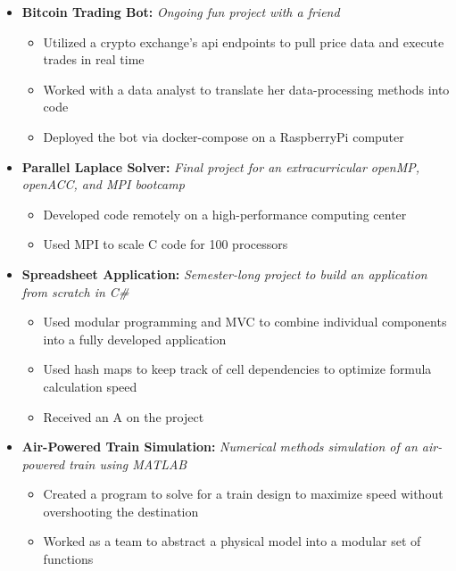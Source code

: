 \documentclass{article}
\begin{document}
\begin{itemize}
    \item \textbf{Bitcoin Trading Bot:}
        \textit{Ongoing fun project with a friend}
        \begin{itemize}
            \item Utilized a crypto exchange's api endpoints to pull price data and execute trades in real time
            \item Worked with a data analyst to translate her data-processing methods into code
            \item Deployed the bot via docker-compose on a RaspberryPi computer
        \end{itemize}
    \vspace{4mm}
    \item \textbf{Parallel Laplace Solver:} \textit{Final project for an extracurricular openMP, openACC, and MPI bootcamp}
    \begin{itemize}
        \item Developed code remotely on a high-performance computing center
        \item Used MPI to scale C code for 100 processors
    \end{itemize}
    \vspace{4mm}
    \item \textbf{Spreadsheet Application:}
    \textit{Semester-long project to build an application from scratch in C\#}
    \begin{itemize}
        \item Used modular programming and MVC to combine individual components into a fully developed application
        \item Used hash maps to keep track of cell dependencies to optimize formula calculation speed
        \item Received an A on the project
    \end{itemize}
    \vspace{4mm}
    \item \textbf{Air-Powered Train Simulation:}
         \textit{Numerical methods simulation of an air-powered train using MATLAB}
         \begin{itemize}
             \item Created a program to solve for a train design to maximize speed without overshooting the destination
             \item Worked as a team to abstract a physical model into a modular set of functions
         \end{itemize}
\end{itemize}
\end{document}
